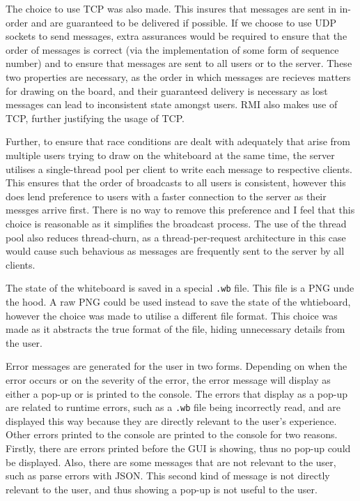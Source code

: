 \documentclass[12pt]{article}
\begin{document}
The choice to use TCP was also made. This insures that messages are sent in in-order and are guaranteed to be delivered if possible. If we choose to use UDP sockets to send messages, extra assurances would be required to ensure that the order of messages is correct (via the implementation of some form of sequence number) and to ensure that messages are sent to all users or to the server. These two properties are necessary, as the order in which messages are recieves matters for drawing on the board, and their guaranteed delivery is necessary as lost messages can lead to inconsistent state amongst users. RMI also makes use of TCP, further justifying the usage of TCP.

Further, to ensure that race conditions are dealt with adequately that arise from multiple users trying to draw on the whiteboard at the same time, the server utilises a single-thread pool per client to write each message to respective clients. This ensures that the order of broadcasts to all users is consistent, however this does lend preference to users with a faster connection to the server as their messges arrive first. There is no way to remove this preference and I feel that this choice is reasonable as it simplifies the broadcast process. The use of the thread pool also reduces thread-churn, as a thread-per-request architecture in this case would cause such behavious as messages are frequently sent to the server by all clients.

The state of the whiteboard is saved in a special \texttt{.wb} file. This file is a PNG unde the hood. A raw PNG could be used instead to save the state of the whtieboard, however the choice was made to utilise a different file format. This choice was made as it abstracts the true format of the file, hiding unnecessary details from the user.

Error messages are generated for the user in two forms. Depending on when the error occurs or on the severity of the error, the error message will display as either a pop-up or is printed to the console. The errors that display as a pop-up are related to runtime errors, such as a \texttt{.wb} file being incorrectly read, and are displayed this way because they are directly relevant to the user's experience. Other errors printed to the console are printed to the console for two reasons. Firstly, there are errors printed before the GUI is showing, thus no pop-up could be displayed. Also, there are some messages that are not relevant to the user, such as parse errors with JSON. This second kind of message is not directly relevant to the user, and thus showing a pop-up is not useful to the user.
\end{document}
